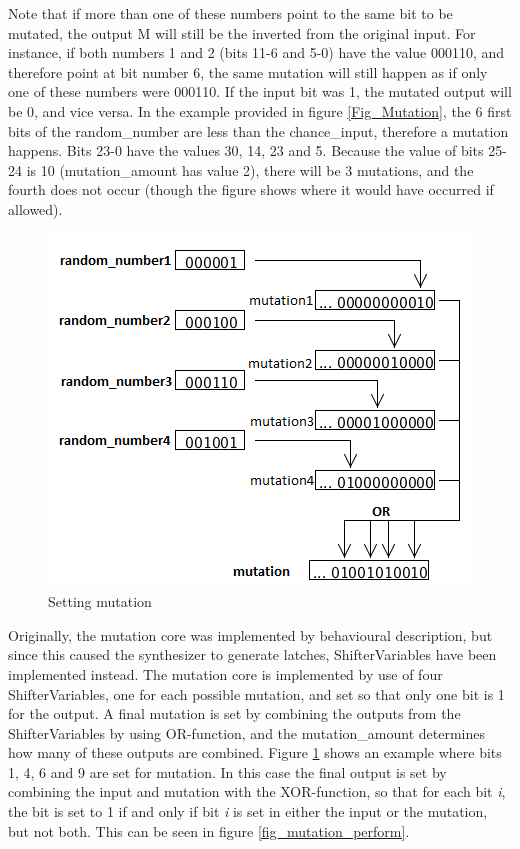 Note that if more than one of these numbers point to the same bit to be mutated, the output M will still be the inverted from the original input. 
For instance, if both numbers 1 and 2 (bits 11-6 and 5-0) have the value 000110, and therefore point at bit number 6, the same mutation will still happen as if only one of these numbers were 000110. 
If the input bit was 1, the mutated output will be 0, and vice versa.
In the example provided in figure \ref{Fig_Mutation}, the 6 first bits of the random\_number are less than the chance\_input, therefore a mutation happens. Bits 23-0 have the values 30, 14, 23 and 5. 
Because the value of bits 25-24 is 10 (mutation\_amount has value 2), there will be 3 mutations, and the fourth does not occur (though the figure shows where it would have occurred if allowed).

\begin{figure}[H]
\includegraphics[width=\textwidth]{fpga/fig/mutation_mask.png}
\caption{Setting mutation}
\label{fig_mutation_mask}
\end{figure}

Originally, the mutation core was implemented by behavioural description, but since this caused the synthesizer to generate latches, ShifterVariables have been implemented instead.
The mutation core is implemented by use of four ShifterVariables, one for each possible mutation, and set so that only one bit is 1 for the output. 
A final mutation is set by combining the outputs from the ShifterVariables by using OR-function, and the mutation\_amount determines how many of these outputs are combined. Figure \ref{fig_mutation_mask} shows an example where bits 1, 4, 6 and 9 are set for mutation. 
In this case the final output is set by combining the input and mutation with the XOR-function, so that for each bit \emph{i}, the bit is set to 1 if and only if bit \emph{i} is set in either the input or the mutation, but not both. This can be seen in figure \ref{fig_mutation_perform}.

